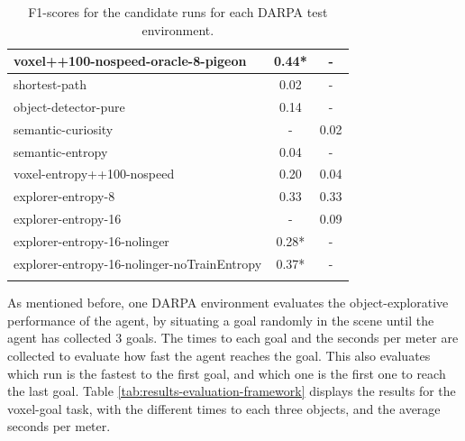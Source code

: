 \begin{longtable}{|l|c|c|}
                        voxel++100-nospeed-oracle-8-pigeon  & {\cellcolor[HTML]{55AA99}} \color[HTML]{000000} 0.44*   & -     \\ \hline

shortest-path                           &  {\cellcolor[HTML]{EBF2F0}} \color[HTML]{000000} 0.02      & -    \\ \hline
object-detector-pure                    & {\cellcolor[HTML]{EBF2F0}} \color[HTML]{000000} 0.14       & -    \\ \hline
semantic-curiosity                      & -                                                          & {\cellcolor[HTML]{EBF2F0}} \color[HTML]{000000} 0.02      \\ \hline
semantic-entropy                        & {\cellcolor[HTML]{EBF2F0}} \color[HTML]{000000} 0.04       & -            \\ \hline
voxel-entropy++100-nospeed              & {\cellcolor[HTML]{D1E6E1}} \color[HTML]{000000} 0.20       & {\cellcolor[HTML]{EBF2F0}} \color[HTML]{000000} 0.04     \\ \hline
explorer-entropy-8                      & {\cellcolor[HTML]{6BB4A6}} \color[HTML]{000000} 0.33      & {\cellcolor[HTML]{6BB4A6}} \color[HTML]{000000} 0.33  \\ \hline
explorer-entropy-16                     & -                                                         & {\cellcolor[HTML]{EBF2F0}} \color[HTML]{000000} 0.09               \\ \hline
                        explorer-entropy-16-nolinger                  &  {\cellcolor[HTML]{88C3B7}} \color[HTML]{000000} 0.28*   & -        \\ \hline
                        explorer-entropy-16-nolinger-noTrainEntropy   & {\cellcolor[HTML]{55AA99}} \color[HTML]{000000} 0.37*    & -         \\ \hline

  

    \caption{F1-scores for the candidate runs for each DARPA test environment.}
    \label{tab:results-darpa-candidates}
\end{longtable}


As mentioned before, one DARPA environment evaluates the object-explorative performance of the agent, by situating a goal randomly in the scene until the agent has collected 3 goals. The times to each goal and the seconds per meter are collected to evaluate how fast the agent reaches the goal. This also evaluates which run is the fastest to the first goal, and which one is the first one to reach the last goal. 
Table \ref{tab:results-evaluation-framework} displays the results for the voxel-goal task, with the different times to each three objects, and the average seconds per meter.


